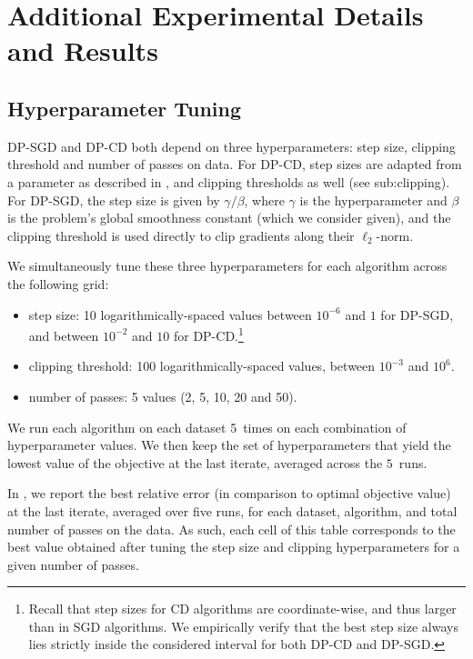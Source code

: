 




\section{Additional Experimental Details and Results}
\label{sec:experimental-setup}

\subsection{Hyperparameter Tuning}
\label{sec:hyperp-tuning}

DP-SGD and DP-CD both depend on three hyperparameters: step size,
clipping threshold and number of passes on data. For DP-CD, step sizes
are adapted from a parameter as described in
, and clipping thresholds as well (see \Cref
{sub:clipping}). For DP-SGD, the step size is given by $\gamma/\beta$,
where $\gamma$ is the hyperparameter and $\beta$ is the problem's global
smoothness constant  (which we consider given), and the clipping threshold is
used directly to clip gradients along their $\ell_2$-norm.

We simultaneously tune these three hyperparameters for each algorithm across
the following grid:
\begin{itemize}
\item step size: 10 logarithmically-spaced values between $10^{-6}$
  and $1$ for DP-SGD, and between $10^{-2}$ and $10$ for DP-CD.\footnote{Recall that step sizes for CD algorithms are coordinate-wise, and
  thus larger than in SGD algorithms. We empirically verify that
  the best
  step size always lies strictly inside the considered interval for both
  DP-CD and DP-SGD.}
\item clipping threshold: 100 logarithmically-spaced values, between
  $10^{-3}$ and $10^{6}$.
\item number of passes: 5 values (2, 5, 10, 20 and 50).
\end{itemize}
We run each algorithm on each dataset 5~times on each combination of
hyperparameter values.  We then keep the set of hyperparameters that
yield the lowest value of the objective at the last iterate, averaged
across the $5$~runs.

In , we report the best relative error
(in comparison to optimal objective value) at the last iterate,
averaged over five runs, for each dataset, algorithm, and total number
of passes on the data. As such, each cell of this table corresponds to
the best value obtained after tuning the step size and clipping
hyperparameters for a given number of passes.

